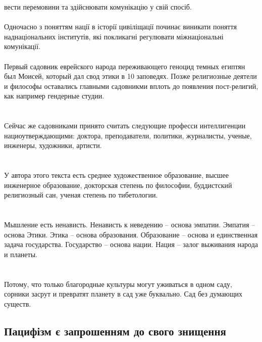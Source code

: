 вести перемовини та здійснювати комунікацію у свій спосіб.
\\
\\
Одночасно з поняттям нації в історії цивіліщації починає виникати поняття наднаціональних інститутів,
які покликагні регулювати міжнаціональні комунікації.
\\
\\
Первый садовник еврейского народа переживающего геноцид темных египтян был Моисей, который дал свод этики в 10 заповедях. Позже религиозные деятели и философы оставались главными садовникми вплоть до появления пост-религий, как например гендерные студии.\\
\\
\\
Сейчас же садовниками принято считать следующие професси интеллигенции нациоутверждающими: доктора, преподаватели, политики, журналисты, ученые, инженеры, художники, артисти.\\
\\
\\
У автора этого текста есть среднее художественное образование, высшее инженерное образование, докторская степень по философии, буддистский религиозный сан, ученая степень по тибетологии.\\
\\
\\
Мышление есть ненависть. Ненависть к неведению -- основа эмпатии. Эмпатия -- основа Этики. Этика -- основа образования. Образование -- основа и единственная задача государства. Государство -- основа нации. Нация -- залог выживания народа и планеты.\\
\\
\\
Потому, что только благородные культуры могут уживаться в одном саду, сорники засрут и превратят планету в сад уже буквально. Сад без думающих существ.\\

\subsection{Пацифізм є запрошенням до свого знищення}

